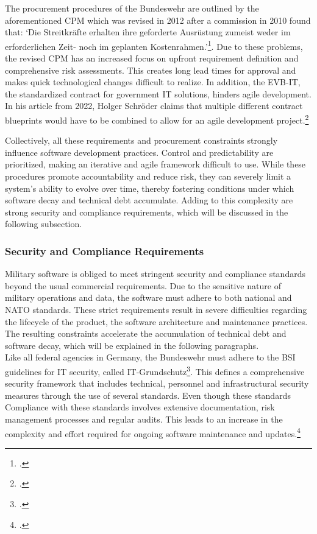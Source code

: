 The procurement procedures of the Bundeswehr are outlined by the aforementioned \ac{CPM} which was revised in 2012 after a commission in 2010 found that: 
`Die Streitkräfte erhalten ihre geforderte Ausrüstung zumeist weder im erforderlichen Zeit- noch im geplanten Kostenrahmen.'\footcite[36]{strukturkommissionderbundeswehrBerichtStrukturkommissionBundeswehr2010}.
Due to these problems, the revised \ac{CPM} has an increased focus on upfront requirement definition and comprehensive risk assessments. This creates long lead times
for approval and makes quick technological changes difficult to realize.
In addition, the \ac{EVB-IT}, the standardized contract for government IT solutions, hinders agile development. In his article from 2022,
Holger Schröder claims that multiple different contract blueprints would have to be combined to allow for an agile development project.\footcite{schroederUngeeignetFuerAgile2022}

Collectively, all these requirements and procurement constraints strongly influence software development practices. Control and predictability are prioritized, making
an iterative and agile framework difficult to use. While these procedures promote accountability and reduce risk, they can severely limit a system's ability to evolve over time, thereby fostering conditions under which software decay and technical debt accumulate. 
Adding to this complexity are strong security and compliance requirements, which will be discussed in the following subsection.

\subsubsection{Security and Compliance Requirements}
Military software is obliged to meet stringent security and compliance standards beyond the usual commercial requirements. Due to the sensitive nature of military operations and data,
the software must adhere to both national and NATO standards. These strict requirements result in severe difficulties 
regarding the lifecycle of the product, the software architecture and maintenance practices. The resulting constraints accelerate the accumulation of technical debt and software decay, which will be explained in the following paragraphs.\\

Like all federal agencies in Germany, the Bundeswehr must adhere to the \ac{BSI} guidelines for IT security, called IT-Grundschutz\footcite{bundesamtfuersicherheitinderinformationstechnikBSIFAQ}. This defines a comprehensive security framework
that includes technical, personnel and infrastructural security measures through the use of several standards. Even though these standards Compliance with these standards involves extensive documentation, risk management processes and regular audits. 
This leads to an increase in the complexity and effort required for ongoing software maintenance and updates.\footcite{bundesamtfuersicherheitinderinformationstechnikBSIStandards}\\

